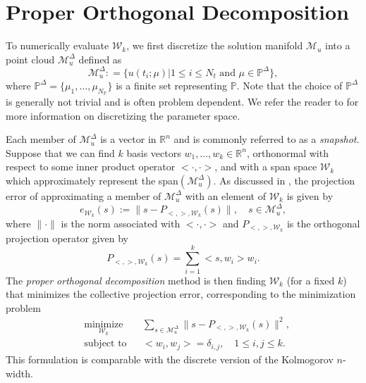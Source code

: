 \section{Proper Orthogonal Decomposition} \label{sec:3.2}
To numerically evaluate $\mathcal W_k$, we first discretize the solution manifold $\mathcal M_{u}$ into a point cloud $\mathcal M_{u}^{\Delta}$ defined as
\begin{equation} \label{eq:3.7}
	\mathcal M_{u}^{\Delta} : = \{ u(t_i;\mu) |  1\leq i \leq N_t \text{ and } \mu \in \mathbb P^{\Delta} \},
\end{equation}
where $\mathbb P^{\Delta} = \{ \mu_{1} , \dots , \mu_{N_{\mathbb P}} \}$ is a finite set representing $\mathbb P$. Note that the choice of $\mathbb P^{\Delta}$ is generally not trivial and is often problem dependent. We refer the reader to \cite{quarteroni2015reduced} for more information on discretizing the parameter space.

Each member of $\mathcal M_{u}^{\Delta}$ is a vector in $\mathbb R^{n}$ and is commonly referred to as a \emph{snapshot}. Suppose that we can find $k$ basis vectors $w_1,\dots,w_k\in \mathbb R^{n}$, orthonormal with respect to some inner product operator $<\cdot,\cdot>$, and with a span space $\mathcal W_k$ which approximately represent the span$(\mathcal M_u^\Delta)$. As discussed in , the projection error of approximating a member of $\mathcal M_{u}^{\Delta}$ with an element of $\mathcal W_k$ is given by
\begin{equation} \label{eq:3.8}
	e_{\mathcal W_k}(s) := \| s - P_{<,>,\mathcal W_k}(s) \|, \quad s\in \mathcal M_u^{\Delta},
\end{equation}
where $\| \cdot \|$ is the norm associated with $<\cdot,\cdot>$ and $P_{<,>,\mathcal W_k}$ is the orthogonal projection operator given by
\begin{equation} \label{eq:3.9}
	P_{<,>,\mathcal W_k}(s) = \sum_{i=1}^k <s,w_i> w_i.
\end{equation}
The \emph{proper orthogonal decomposition} method is then finding $\mathcal W_k$ (for a fixed $k$) that minimizes the collective projection error, corresponding to the minimization problem
\begin{equation} \label{eq:3.10}
\begin{aligned}
&  \underset{\mathcal W_k}{\text{minimize}}
& & \sum_{s\in \mathcal M_u^{\Delta}} \| s - P_{<,>,\mathcal W_k} (s)\|^2, \\
& \text{subject to}
& & <w_i,w_j> = \delta_{i,j}, \quad 1\leq i,j \leq k.
\end{aligned}
\end{equation}
This formulation is comparable with the discrete version of the Kolmogorov $n$-width. 
